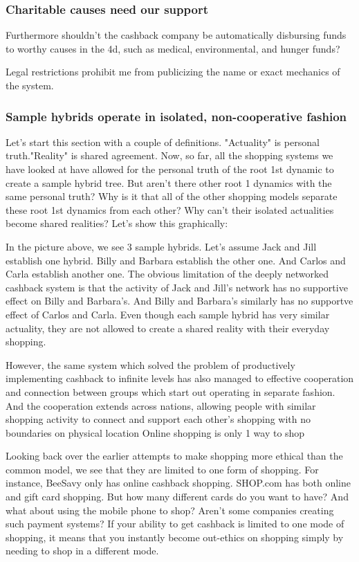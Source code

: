 \documentclass{article}%
\begin{document}
\subsubsection{Charitable causes need our support}

Furthermore shouldn't the cashback company be automatically disbursing funds to worthy causes in the 4d, such as medical, environmental, and hunger funds?

Legal restrictions prohibit me from publicizing the name or exact mechanics of the system.

\subsubsection{Sample hybrids operate in isolated, non-cooperative fashion}

Let's start this section with a couple of definitions. "Actuality" is personal truth."Reality" is shared agreement. Now, so far, all the shopping systems we have looked at have allowed for the personal truth of the root 1st dynamic to create a sample hybrid tree. But aren't there other root 1 dynamics with the same personal truth? Why is it that all of the other shopping models separate these root 1st dynamics from each other? Why can't their isolated actualities become shared realities? Let's show this graphically:

In the picture above, we see 3 sample hybrids. Let's assume Jack and Jill establish one hybrid. Billy and Barbara establish the other one. And Carlos and Carla establish another one. The obvious limitation of the deeply networked cashback system is that the activity of Jack and Jill's network has no supportive effect on Billy and Barbara's. And Billy and Barbara's similarly has no supportve effect of Carlos and Carla. Even though each sample hybrid has very similar actuality, they are not allowed to create a shared reality with their everyday shopping.

However, the same system which solved the problem of productively implementing cashback to infinite levels has also managed to effective cooperation and connection between groups which start out operating in separate fashion. And the cooperation extends across nations, allowing people with similar shopping activity to connect and support each other's shopping with no boundaries on physical location
Online shopping is only 1 way to shop

Looking back over the earlier attempts to make shopping more ethical than the common model, we see that they are limited to one form of shopping. For instance, BeeSavy only has online cashback shopping. SHOP.com has both online and gift card shopping. But how many different cards do you want to have? And what about using the mobile phone to shop? Aren't some companies creating such payment systems? If your ability to get cashback is limited to one mode of shopping, it means that you instantly become out-ethics on shopping simply by needing to shop in a different mode. 
\end{document}
